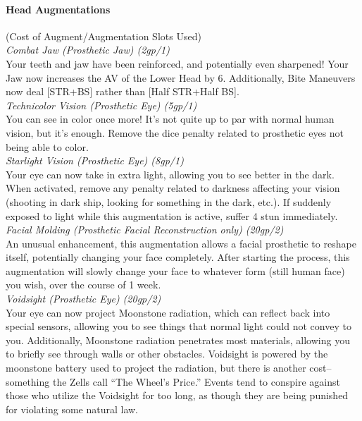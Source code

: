 \documentclass[a4paper, twocolumn, openany]{book}
\newlength{\indentlen}
\newcommand{\tabto}[1]{\setlength{\leftskip}{#1\indentlen}}
\begin{document}
{\paragraph{Head Augmentations} (Cost of Augment/Augmentation Slots Used)\\

\tabto{1}
	{\slshape Combat Jaw (Prosthetic Jaw) (2gp/1)\\}
	Your teeth and jaw have been reinforced, and potentially even sharpened! Your Jaw now
	increases the AV of the Lower Head by 6. Additionally, Bite Maneuvers now deal [STR+BS]
	rather than [Half STR+Half BS].\\

	{\slshape Technicolor Vision (Prosthetic Eye) (5gp/1)\\}
	You can see in color once more! It’s not quite up to par with normal human vision, but it’s
	enough. Remove the dice penalty related to prosthetic eyes not being able to color.\\

	{\slshape Starlight Vision (Prosthetic Eye) (8gp/1)\\}
	Your eye can now take in extra light, allowing you to see better in the dark. When activated,
	remove any penalty related to darkness affecting your vision (shooting in dark ship, looking for
	something in the dark, etc.). If suddenly exposed to light while this augmentation is active, suffer
	4 stun immediately.\\

	{\slshape Facial Molding (Prosthetic Facial Reconstruction only) (20gp/2)\\}
	An unusual enhancement, this augmentation allows a facial prosthetic to reshape itself,
	potentially changing your face completely. After starting the process, this augmentation will
	slowly change your face to whatever form (still human face) you wish, over the course of 1
	week.\\

	{\slshape Voidsight (Prosthetic Eye) (20gp/2)\\}
	Your eye can now project Moonstone radiation, which can reflect back into special sensors,
	allowing you to see things that normal light could not convey to you. Additionally, Moonstone
	radiation penetrates most materials, allowing you to briefly see through walls or other obstacles.
	Voidsight is powered by the moonstone battery used to project the radiation, but there is
	another cost--something the Zells call “The Wheel’s Price.” Events tend to conspire against
	those who utilize the Voidsight for too long, as though they are being punished for violating
	some natural law.\\

}
\end{document}
